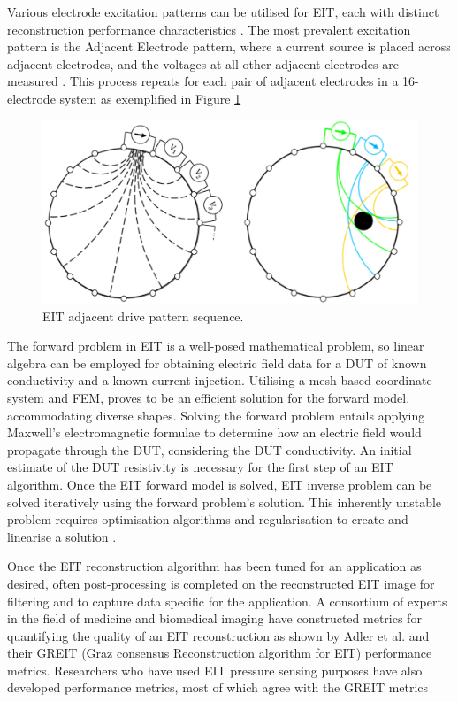 Various electrode excitation patterns can be utilised for EIT, each with distinct reconstruction performance characteristics \citep{Russo2017,Sherry2006,Brown1987}. The most prevalent excitation pattern is the Adjacent Electrode pattern, where a current source is placed across adjacent electrodes, and the voltages at all other adjacent electrodes are measured \citep{Adler2021}. This process repeats for each pair of adjacent electrodes in a 16-electrode system as exemplified in Figure \ref{fig:EIT_adj_drive}
\begin{figure}[H]
	\centering
	\includegraphics[width=0.8\linewidth]{Figures/eit_sequence.png}
	\caption{EIT adjacent drive pattern sequence.}
	\label{fig:EIT_adj_drive}
\end{figure}

The forward problem in EIT is a well-posed mathematical problem, so linear algebra can be employed for obtaining electric field data for a DUT of known conductivity and a known current injection. Utilising a mesh-based coordinate system and FEM, proves to be an efficient solution for the forward model, accommodating diverse shapes. Solving the forward problem entails applying Maxwell's electromagnetic formulae to determine how an electric field would propagate through the DUT, considering the DUT conductivity. An initial estimate of the DUT resistivity is necessary for the first step of an EIT algorithm. Once the EIT forward model is solved, EIT inverse problem can be solved iteratively using the forward problem's solution. This inherently unstable problem requires optimisation algorithms and regularisation to create and linearise a solution \citep{Bayford2018,Lionheart2003,Martins2019,Adler2021}.

Once the EIT reconstruction algorithm has been tuned for an application as desired, often post-processing is completed on the reconstructed EIT image for filtering and to capture data specific for the application. A consortium of experts in the field of medicine and biomedical imaging  have constructed metrics for quantifying the quality of an EIT reconstruction as shown by Adler et al. \citep{Adler2009} and their GREIT (Graz consensus Reconstruction algorithm for EIT) performance metrics. Researchers who have used EIT pressure sensing purposes have also developed performance metrics, most of which agree with the GREIT metrics \citep{Wang2020,Silvera-Tawil2015,Visentin2016,Tallman2020,Sun2020,Hassan2009,Kato2007}

